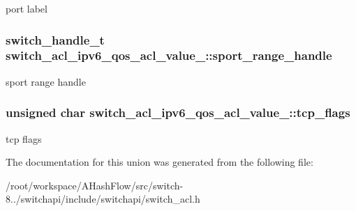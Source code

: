 port label \hypertarget{unionswitch__acl__ipv6__qos__acl__value___a6b6801f2ac43308b5d5f9a68491bd2f2}{
\subsubsection[{sport\+\_\+range\+\_\+handle}]{\setlength{\rightskip}{0pt plus 5cm}switch\+\_\+handle\+\_\+t switch\+\_\+acl\+\_\+ipv6\+\_\+qos\+\_\+acl\+\_\+value\+\_\+\+::sport\+\_\+range\+\_\+handle}}\label{unionswitch__acl__ipv6__qos__acl__value___a6b6801f2ac43308b5d5f9a68491bd2f2}
sport range handle \hypertarget{unionswitch__acl__ipv6__qos__acl__value___aae3c76a4c682a337b27a043845760585}{
\subsubsection[{tcp\+\_\+flags}]{\setlength{\rightskip}{0pt plus 5cm}unsigned char switch\+\_\+acl\+\_\+ipv6\+\_\+qos\+\_\+acl\+\_\+value\+\_\+\+::tcp\+\_\+flags}}\label{unionswitch__acl__ipv6__qos__acl__value___aae3c76a4c682a337b27a043845760585}
tcp flags 

The documentation for this union was generated from the following file\+:\begin{DoxyCompactItemize}
\item 
/root/workspace/\+A\+Hash\+Flow/src/switch-\/8../switchapi/include/switchapi/switch\+\_\+acl.\+h\end{DoxyCompactItemize}
